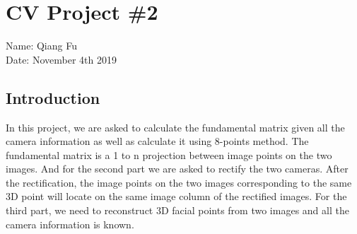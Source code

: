 \documentclass{article}
\begin{document}
\section*{CV Project \#2}
Name: Qiang Fu
\\Date: November 4th 2019
\subsection*{Introduction}
\par
In this project, we are asked to calculate the fundamental matrix given all the camera information as well as calculate it using 8-points method. The fundamental matrix is a 1 to n projection between image points on the two images. And for the second part we are asked to rectify the two cameras. After the rectification, the image points on the two images corresponding to the same 3D point will locate on the same image column of the rectified images. For the third part, we need to reconstruct 3D facial points from two images and all the camera information is known.
\end{document}

